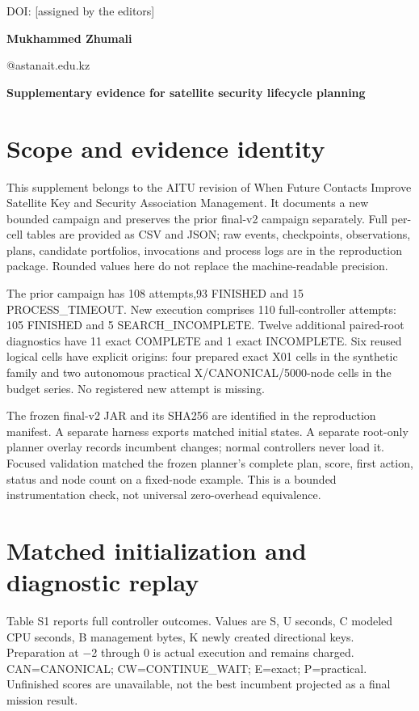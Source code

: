 \documentclass[12pt,a4paper]{article}
\begin{document}
\noindent DOI: [assigned by the editors]\par
\noindent\textbf{Mukhammed Zhumali}\par
{}@astanait.edu.kz\par
\begin{center}\textbf{Supplementary evidence for satellite security lifecycle planning}\end{center}
\section*{Scope and evidence identity}
This supplement belongs to the AITU revision of When Future Contacts Improve Satellite Key and Security Association Management. It documents a new bounded campaign and preserves the prior final-v2 campaign separately. Full per-cell tables are provided as CSV and JSON; raw events, checkpoints, observations, plans, candidate portfolios, invocations and process logs are in the reproduction package. Rounded values here do not replace the machine-readable precision.

The prior campaign has 108 attempts,93 FINISHED and 15 PROCESS\_TIMEOUT. New execution comprises 110 full-controller attempts: 105 FINISHED and 5 SEARCH\_INCOMPLETE. Twelve additional paired-root diagnostics have 11 exact COMPLETE and 1 exact INCOMPLETE. Six reused logical cells have explicit origins: four prepared exact X01 cells in the synthetic family and two autonomous practical X/CANONICAL/5000-node cells in the budget series. No registered new attempt is missing.

The frozen final-v2 JAR and its SHA256 are identified in the reproduction manifest. A separate harness exports matched initial states. A separate root-only planner overlay records incumbent changes; normal controllers never load it. Focused validation matched the frozen planner's complete plan, score, first action, status and node count on a fixed-node example. This is a bounded instrumentation check, not universal zero-overhead equivalence.

\section*{Matched initialization and diagnostic replay}
Table S1 reports full controller outcomes. Values are S, U seconds, C modeled CPU seconds, B management bytes, K newly created directional keys. Preparation at $-$2 through 0 is actual execution and remains charged. CAN=CANONICAL; CW=CONTINUE\_WAIT; E=exact; P=practical. Unfinished scores are unavailable, not the best incumbent projected as a final mission result.
\end{document}
